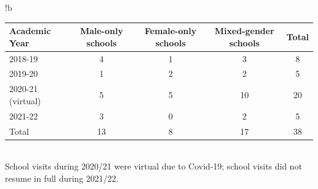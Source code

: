
\begin{tabbox}{!b}

\caption{School visits to female-only, male-only, and mixed-gender schools}
\label{tab:schoolvisits}
\footnotesize   
\begin{tabular}{p{2.5cm} 
                !{\qquad}
                S[table-format=2.0]
                !{\qquad}
                S[table-format=2.0]
                !{\qquad}
                S[table-format=2.0]
                !{\qquad}
                S[table-format=3.0]
                }

\toprule 
Academic Year & {Male-only schools} & {Female-only schools} & {Mixed-gender schools} & {Total}\\
\midrule 
2018-19 & 4 & 1 & 3 & 8\\
\hdashline 
2019-20 & 1 & 2 & 2 & 5\\
\hdashline 
2020-21 (virtual) & 5 & 5 & 10 & 20\\
\hdashline 
2021-22 & 3 & 0 & 2 & 5\\
\midrule 
Total & 13 & 8 & 17 & 38 \\
\bottomrule 
\end{tabular}
\vspace{2mm}\\
{\sffamily
School visits during 2020/21 were virtual due to Covid-19; school visits did not resume in full during 2021/22.}
\end{tabbox}
